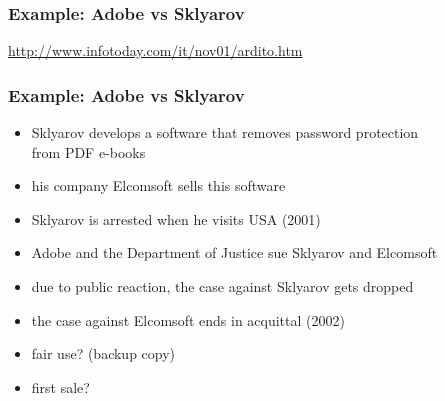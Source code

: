 \documentclass[dvipsnames]{beamer}
\theoremstyle{plain}
\begin{document}
\begin{frame}
  \frametitle{Example: Adobe vs Sklyarov}

  \begin{center}
  \end{center}

  \medskip
  \tiny{\url{http://www.infotoday.com/it/nov01/ardito.htm}}\\
\end{frame}

\begin{frame}
  \frametitle{Example: Adobe vs Sklyarov}

  \begin{itemize}
    \item Sklyarov develops a software that removes password protection\\
      from PDF e-books
    \item his company Elcomsoft sells this software
    \item Sklyarov is arrested when he visits USA (2001)
    \item Adobe and the Department of Justice sue Sklyarov and Elcomsoft
    \item due to public reaction, the case against Sklyarov gets dropped
    \item the case against Elcomsoft ends in acquittal (2002)

    \pause
    \medskip
    \item fair use? (backup copy)
    \item first sale?
  \end{itemize}
\end{frame}
\end{document}
